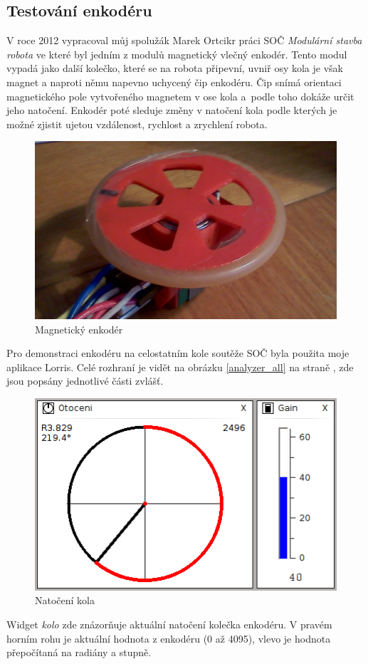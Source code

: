 \documentclass[12pt, a4paper, oneside]{article}
\newcommand{\It}{\textit}  %
\begin{document}
\newpage
\subsection{Testování enkodéru}
V roce 2012 vypracoval můj spolužák Marek Ortcikr práci SOČ \It{Modulární stavba robota} ve které byl jedním z modulů magnetický vlečný enkodér. Tento modul vypadá jako další kolečko, které se na robota připevní, uvniř osy kola je však magnet a naproti němu napevno uchycený čip enkodéru. Čip snímá orientaci magnetického pole vytvořeného magnetem v ose kola a~podle toho dokáže určit jeho natočení. Enkodér poté sleduje změny v natočení kola podle kterých je možné zjistit ujetou vzdálenost, rychlost a zrychlení robota.
\begin{figure}[H]
\begin{center}
\includegraphics[width=\textwidth]{img/enc_real.png}
\caption{Magnetický enkodér}
\end{center}
\end{figure}
Pro demonstraci enkodéru na celostatním kole soutěže SOČ byla použita moje aplikace Lorris. Celé rozhraní je vidět na obrázku \ref{analyzer_all} na straně \pageref{analyzer_all}, zde jsou popsány jednotlivé části zvlášť.

\begin{figure}[H]
\begin{center}
\includegraphics[width=\textwidth-45pt]{img/enc_circle.png}
\caption{Natočení kola}
\end{center}
\end{figure}
Widget \It{kolo} zde znázorňuje aktuální natočení kolečka enkodéru. V pravém horním rohu je aktuální hodnota z enkodéru (0 až 4095), vlevo je hodnota přepočítaná na radiány a stupně.
\end{document}
